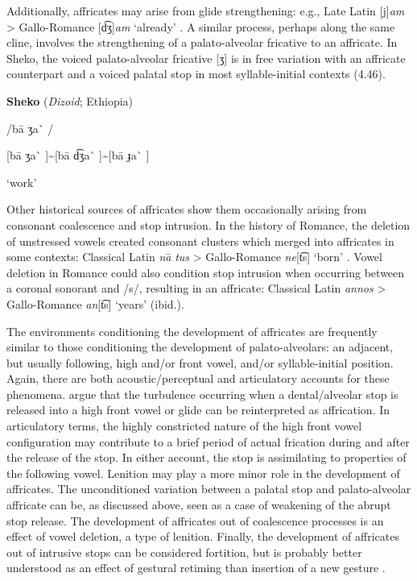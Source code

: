   Additionally, affricates may arise from glide strengthening: e.g., Late Latin [j]\textit{am} > Gallo-Romance [d͡ʒ]\textit{am} ‘already’ \citep[132]{Berns2013}. A similar process, perhaps along the same cline, involves the strengthening of a palato-alveolar fricative to an affricate. In Sheko, the voiced palato-alveolar fricative [ʒ] is in free variation with an affricate counterpart and a voiced palatal stop in most syllable-initial contexts (4.46).

\ea\label{ex:(4.46)}
  \textbf{Sheko} (\textit{Dizoid}; Ethiopia)

/ba\={} ʒa\`{} /

[ba\={} ʒa\`{} ]{\textasciitilde}[ba\={} d͡ʒa\`{} ]{\textasciitilde}[ba\={} ɟa\`{} ]

‘work’

\citep[86]{Hellenthal2010}

\z

  Other historical sources of affricates show them occasionally arising from consonant coalescence and stop intrusion. In the history of Romance, the deletion of unstressed vowels created consonant clusters which merged into affricates in some contexts: Classical Latin \textit{na}\textsf{\={} }\textit{tus} > Gallo-Romance \textit{ne}[t͡s] ‘born’ \citep[128]{Berns2013}. Vowel deletion in Romance could also condition stop intrusion when occurring between a coronal sonorant and /s/, resulting in an affricate: Classical Latin \textit{annos} > Gallo-Romance \textit{an}[t͡s] ‘years’ (ibid.).

  The environments conditioning the development of affricates are frequently similar to those conditioning the development of palato-alveolars: an adjacent, but usually following, high and/or front vowel, and/or syllable-initial position. Again, there are both acoustic/perceptual and articulatory accounts for these phenomena. \citet{HallEtAl2006} argue that the turbulence occurring when a dental/alveolar stop is released into a high front vowel or glide can be reinterpreted as affrication. In articulatory terms, the highly constricted nature of the high front vowel configuration may contribute to a brief period of actual frication during and after the release of the stop. In either account, the stop is assimilating to properties of the following vowel. Lenition may play a more minor role in the development of affricates. The unconditioned variation between a palatal stop and palato-alveolar affricate can be, as discussed above, seen as a case of weakening of the abrupt stop release. The development of affricates out of coalescence processes is an effect of vowel deletion, a type of lenition. Finally, the development of affricates out of intrusive stops can be considered fortition, but is probably better understood as an effect of gestural retiming than insertion of a new gesture \citep[43-44]{Bybee2015b}.

